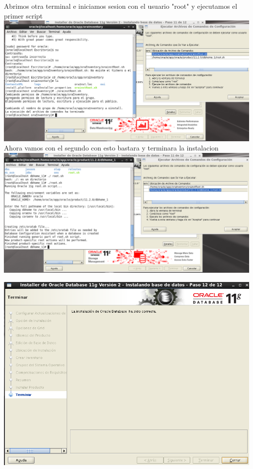 \documentclass[a4paper,openright,12pt]{book}
\begin{document}
\begin{center}
Abrimos otra terminal e iniciamos sesion con el usuario "root" y ejecutamos el primer script
\includegraphics[width=15cm]{./oracle linux/27.png}
Ahora vamos con el segundo  con esto bastara y terminara la instalacion
\includegraphics[width=15cm]{./oracle linux/28.png}

\includegraphics[width=15cm]{./oracle linux/29.png}
\end{center}
\end{document}
